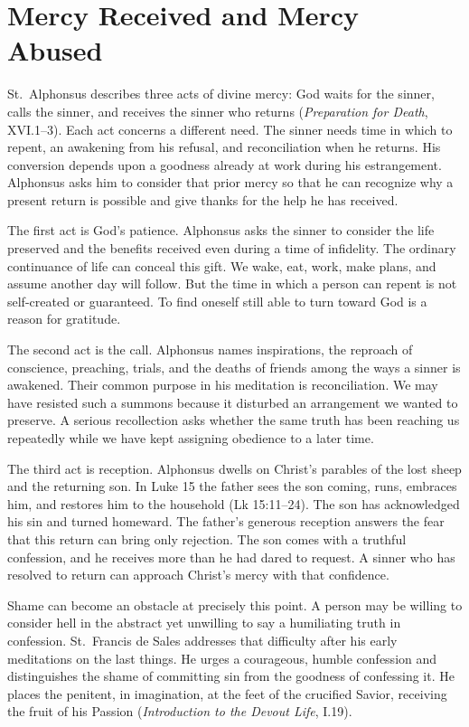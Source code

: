 \section{Mercy Received and Mercy Abused}

St.~Alphonsus describes three acts of divine mercy: God waits for the sinner, calls the sinner, and receives the sinner who returns (\emph{Preparation for Death}, XVI.1--3). Each act concerns a different need. The sinner needs time in which to repent, an awakening from his refusal, and reconciliation when he returns. His conversion depends upon a goodness already at work during his estrangement. Alphonsus asks him to consider that prior mercy so that he can recognize why a present return is possible and give thanks for the help he has received.

The first act is God's patience. Alphonsus asks the sinner to consider the life preserved and the benefits received even during a time of infidelity. The ordinary continuance of life can conceal this gift. We wake, eat, work, make plans, and assume another day will follow. But the time in which a person can repent is not self-created or guaranteed. To find oneself still able to turn toward God is a reason for gratitude.

The second act is the call. Alphonsus names inspirations, the reproach of conscience, preaching, trials, and the deaths of friends among the ways a sinner is awakened. Their common purpose in his meditation is reconciliation. We may have resisted such a summons because it disturbed an arrangement we wanted to preserve. A serious recollection asks whether the same truth has been reaching us repeatedly while we have kept assigning obedience to a later time.

The third act is reception. Alphonsus dwells on Christ's parables of the lost sheep and the returning son. In Luke 15 the father sees the son coming, runs, embraces him, and restores him to the household (Lk 15:11--24). The son has acknowledged his sin and turned homeward. The father's generous reception answers the fear that this return can bring only rejection. The son comes with a truthful confession, and he receives more than he had dared to request. A sinner who has resolved to return can approach Christ's mercy with that confidence.

Shame can become an obstacle at precisely this point. A person may be willing to consider hell in the abstract yet unwilling to say a humiliating truth in confession. St.~Francis de Sales addresses that difficulty after his early meditations on the last things. He urges a courageous, humble confession and distinguishes the shame of committing sin from the goodness of confessing it. He places the penitent, in imagination, at the feet of the crucified Savior, receiving the fruit of his Passion (\emph{Introduction to the Devout Life}, I.19).

